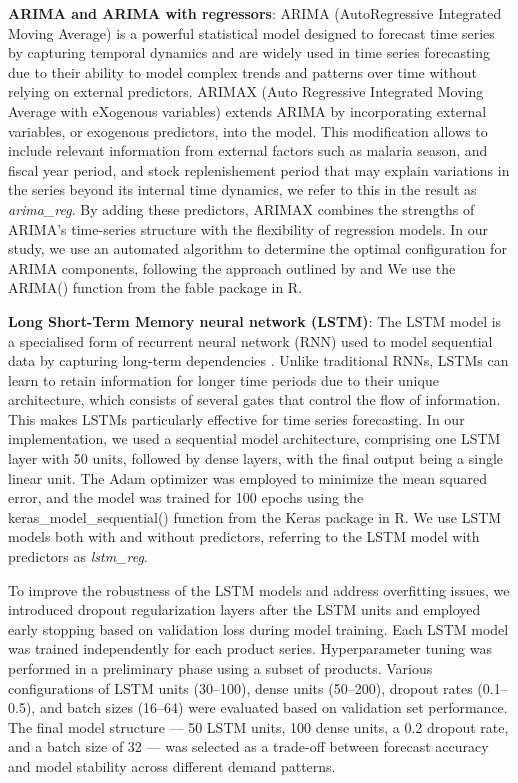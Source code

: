 \documentclass[
  authoryear,
  preprint,
  3p]{elsarticle}
\begin{document}
\textbf{ARIMA and ARIMA with regressors}: ARIMA (AutoRegressive
Integrated Moving Average) is a powerful statistical model designed to
forecast time series by capturing temporal dynamics and are widely used
in time series forecasting due to their ability to model complex trends
and patterns over time without relying on external predictors. ARIMAX
(Auto Regressive Integrated Moving Average with eXogenous variables)
extends ARIMA by incorporating external variables, or exogenous
predictors, into the model. This modification allows to include relevant
information from external factors such as malaria season, and fiscal
year period, and stock replenishement period that may explain variations
in the series beyond its internal time dynamics, we refer to this in the
result as \emph{arima\_reg}. By adding these predictors, ARIMAX combines
the strengths of ARIMA's time-series structure with the flexibility of
regression models. In our study, we use an automated algorithm to
determine the optimal configuration for ARIMA components, following the
approach outlined by \citet{hyndman2021forecasting} and We use the
ARIMA() function from the fable package in R.

\textbf{Long Short-Term Memory neural network (LSTM)}: The LSTM model is
a specialised form of recurrent neural network (RNN) used to model
sequential data by capturing long-term dependencies
\citep{graves2012long}. Unlike traditional RNNs, LSTMs can learn to
retain information for longer time periods due to their unique
architecture, which consists of several gates that control the flow of
information. This makes LSTMs particularly effective for time series
forecasting. In our implementation, we used a sequential model
architecture, comprising one LSTM layer with 50 units, followed by dense
layers, with the final output being a single linear unit. The Adam
optimizer was employed to minimize the mean squared error, and the model
was trained for 100 epochs using the keras\_model\_sequential() function
from the Keras package in R. We use LSTM models both with and without
predictors, referring to the LSTM model with predictors as
\emph{lstm\_reg}.

To improve the robustness of the LSTM models and address overfitting
issues, we introduced dropout regularization layers after the LSTM units
and employed early stopping based on validation loss during model
training. Each LSTM model was trained independently for each product
series. Hyperparameter tuning was performed in a preliminary phase using
a subset of products. Various configurations of LSTM units (30--100),
dense units (50--200), dropout rates (0.1--0.5), and batch sizes
(16--64) were evaluated based on validation set performance. The final
model structure --- 50 LSTM units, 100 dense units, a 0.2 dropout rate,
and a batch size of 32 --- was selected as a trade-off between forecast
accuracy and model stability across different demand patterns.
\end{document}
